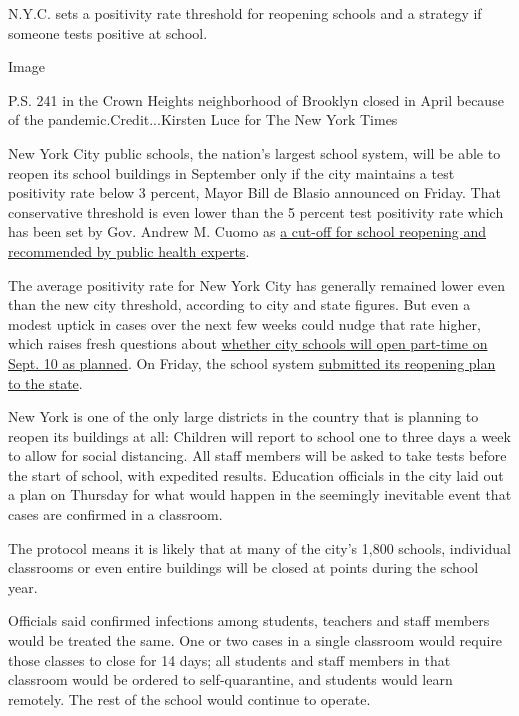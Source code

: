 N.Y.C. sets a positivity rate threshold for reopening schools and a
strategy if someone tests positive at school.

Image

P.S. 241 in the Crown Heights neighborhood of Brooklyn closed in April
because of the pandemic.Credit...Kirsten Luce for The New York Times

New York City public schools, the nation's largest school system, will
be able to reopen its school buildings in September only if the city
maintains a test positivity rate below 3 percent, Mayor Bill de Blasio
announced on Friday. That conservative threshold is even lower than the
5 percent test positivity rate which has been set by Gov. Andrew M.
Cuomo as
\href{https://www.nytimes.com/2020/07/14/us/coronavirus-schools-fall.html}{a
cut-off for school reopening and recommended by public health experts}.

The average positivity rate for New York City has generally remained
lower even than the new city threshold, according to city and state
figures. But even a modest uptick in cases over the next few weeks could
nudge that rate higher, which raises fresh questions about
\href{https://www.nytimes.com/2020/07/08/nyregion/nyc-schools-reopening-plan.html}{whether
city schools will open part-time on Sept. 10 as planned}. On Friday, the
school system
\href{https://infohub.nyced.org/docs/default-source/default-document-library/nyc-doe---state-doh-reopening-plan-7-31.pdf}{submitted
its reopening plan to the state}.

New York is one of the only large districts in the country that is
planning to reopen its buildings at all: Children will report to school
one to three days a week to allow for social distancing. All staff
members will be asked to take tests before the start of school, with
expedited results. Education officials in the city laid out a plan on
Thursday for what would happen in the seemingly inevitable event that
cases are confirmed in a classroom.

The protocol means it is likely that at many of the city's 1,800
schools, individual classrooms or even entire buildings will be closed
at points during the school year.

Officials said confirmed infections among students, teachers and staff
members would be treated the same. One or two cases in a single
classroom would require those classes to close for 14 days; all students
and staff members in that classroom would be ordered to self-quarantine,
and students would learn remotely. The rest of the school would continue
to operate.

